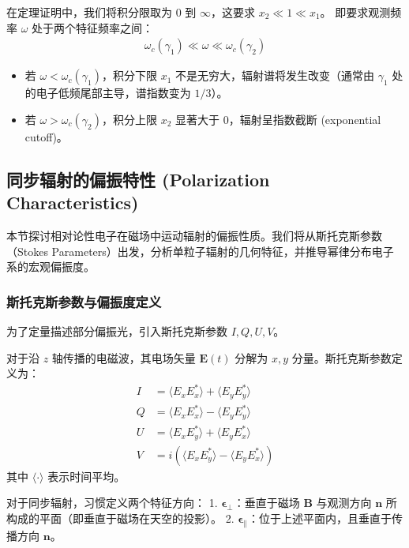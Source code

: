 \begin{derivationnote}[积分限与截止]
    在定理证明中，我们将积分限取为 $0$ 到 $\infty$，这要求 $x_2 \ll 1 \ll x_1$。
    即要求观测频率 $\omega$ 处于两个特征频率之间：
    \begin{align}
        \omega_c(\gamma_1) \ll \omega \ll \omega_c(\gamma_2)
    \end{align}
    \begin{itemize}
        \item 若 $\omega < \omega_c(\gamma_1)$，积分下限 $x_1$ 不是无穷大，辐射谱将发生改变（通常由 $\gamma_1$ 处的电子低频尾部主导，谱指数变为 $1/3$）。
        \item 若 $\omega > \omega_c(\gamma_2)$，积分上限 $x_2$ 显著大于 0，辐射呈指数截断 (exponential cutoff)。
    \end{itemize}
\end{derivationnote}

\subsection{同步辐射的偏振特性 (Polarization Characteristics)}

本节探讨相对论性电子在磁场中运动辐射的偏振性质。我们将从斯托克斯参数（Stokes Parameters）出发，分析单粒子辐射的几何特征，并推导幂律分布电子系的宏观偏振度。

\subsubsection{斯托克斯参数与偏振度定义}

为了定量描述部分偏振光，引入斯托克斯参数 $I, Q, U, V$。

\begin{definition}[斯托克斯参数]
对于沿 $z$ 轴传播的电磁波，其电场矢量 $\mathbf{E}(t)$ 分解为 $x, y$ 分量。斯托克斯参数定义为：
\begin{align}
    I &= \langle E_x E_x^* \rangle + \langle E_y E_y^* \rangle \\
    Q &= \langle E_x E_x^* \rangle - \langle E_y E_y^* \rangle \\
    U &= \langle E_x E_y^* \rangle + \langle E_y E_x^* \rangle \\
    V &= i (\langle E_x E_y^* \rangle - \langle E_y E_x^* \rangle)
\end{align}
其中 $\langle \cdot \rangle$ 表示时间平均。
\end{definition}

对于同步辐射，习惯定义两个特征方向：
1.  $\boldsymbol{\epsilon}_{\perp}$：垂直于磁场 $\mathbf{B}$ 与观测方向 $\mathbf{n}$ 所构成的平面（即垂直于磁场在天空的投影）。
2.  $\boldsymbol{\epsilon}_{\parallel}$：位于上述平面内，且垂直于传播方向 $\mathbf{n}$。

